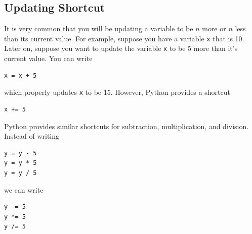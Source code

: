 \documentclass{article}
\begin{document}
\subsection{Updating Shortcut}
It is very common that you will be updating a variable to be $n$ more or $n$ less than its current value. For example, suppose you have a variable \texttt{x} that is 10. Later on, suppose you want to update the variable \texttt{x} to be 5 more than it's current value. You can write
\begin{verbatim}
x = x + 5
\end{verbatim}
which properly updates \texttt{x} to be 15. However, Python provides a shortcut
\begin{verbatim}
x += 5
\end{verbatim}
Python provides similar shortcuts for subtraction, multiplication, and division. Instead of writing
\begin{verbatim}
y = y - 5
y = y * 5
y = y / 5
\end{verbatim}
we can write
\begin{verbatim}
y -= 5
y *= 5
y /= 5
\end{verbatim}
\end{document}
